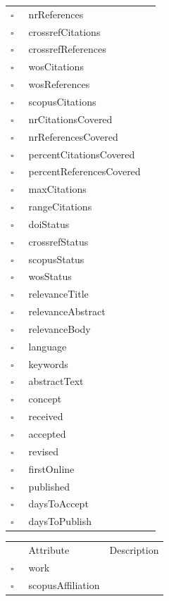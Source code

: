 \begin{table}
\begin{longtable}{llp{8cm}}
$\square$\ & nrReferences &  \\
$\square$\ & crossrefCitations &  \\
$\square$\ & crossrefReferences &  \\
$\square$\ & wosCitations &  \\
$\square$\ & wosReferences &  \\
$\square$\ & scopusCitations &  \\
$\square$\ & nrCitationsCovered &  \\
$\square$\ & nrReferencesCovered &  \\
$\square$\ & percentCitationsCovered &  \\
$\square$\ & percentReferencesCovered &  \\
$\square$\ & maxCitations &  \\
$\square$\ & rangeCitations &  \\
$\square$\ & doiStatus &  \\
$\square$\ & crossrefStatus &  \\
$\square$\ & scopusStatus &  \\
$\square$\ & wosStatus &  \\
$\square$\ & relevanceTitle &  \\
$\square$\ & relevanceAbstract &  \\
$\square$\ & relevanceBody &  \\
$\square$\ & language &  \\
$\square$\ & keywords &  \\
$\square$\ & abstractText &  \\
$\square$\ & concept &  \\
$\square$\ & received &  \\
$\square$\ & accepted &  \\
$\square$\ & revised &  \\
$\square$\ & firstOnline &  \\
$\square$\ & published &  \\
$\square$\ & daysToAccept &  \\
$\square$\ & daysToPublish &  \\
\end{longtable}
\label{attr:Work}
\end{table}

\begin{table}
\caption{WorkAffiliation  }

\begin{longtable}{llp{8cm}}
& Attribute & Description \\
$\square$\ & work &  \\
$\square$\ & scopusAffiliation &  \\
\end{longtable}
\label{attr:WorkAffiliation}
\end{table}
